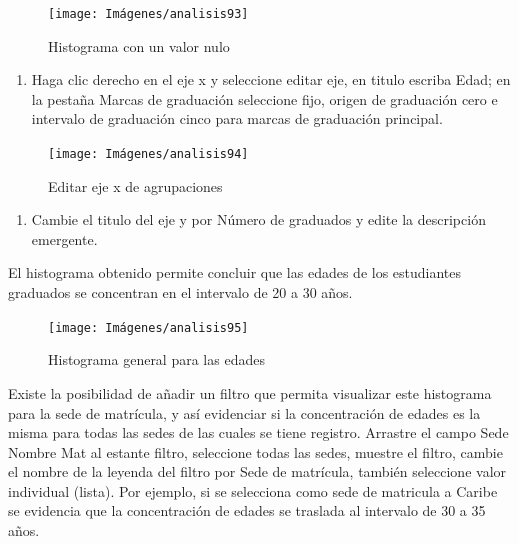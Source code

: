 \documentclass[
]{book}
\providecommand{\tightlist}{%
  \setlength{\itemsep}{0pt}\setlength{\parskip}{0pt}}
\begin{document}
\begin{figure}

{\centering \texttt{[image: Imágenes/analisis93]} 

}

\caption{Histograma con un valor nulo}\label{fig:paso6histograma-fig}
\end{figure}

\begin{enumerate}
\def\labelenumi{\arabic{enumi}.}
\setcounter{enumi}{6}
\tightlist
\item
  Haga clic derecho en el eje x y seleccione editar eje, en titulo escriba Edad; en la pestaña Marcas de graduación seleccione fijo, origen de graduación cero e intervalo de graduación cinco para marcas de graduación principal.
\end{enumerate}

\begin{figure}

{\centering \texttt{[image: Imágenes/analisis94]} 

}

\caption{Editar eje x de agrupaciones}\label{fig:paso7histograma-fig}
\end{figure}

\begin{enumerate}
\def\labelenumi{\arabic{enumi}.}
\setcounter{enumi}{7}
\tightlist
\item
  Cambie el titulo del eje y por Número de graduados y edite la descripción emergente.
\end{enumerate}

El histograma obtenido permite concluir que las edades de los estudiantes graduados se concentran en el intervalo de 20 a 30 años.

\begin{figure}

{\centering \texttt{[image: Imágenes/analisis95]} 

}

\caption{Histograma general para las edades}\label{fig:histogramabase-fig}
\end{figure}

Existe la posibilidad de añadir un filtro que permita visualizar este histograma para la sede de matrícula, y así evidenciar si la concentración de edades es la misma para todas las sedes de las cuales se tiene registro. Arrastre el campo Sede Nombre Mat al estante filtro, seleccione todas las sedes, muestre el filtro, cambie el nombre de la leyenda del filtro por Sede de matrícula, también seleccione valor individual (lista). Por ejemplo, si se selecciona como sede de matricula a Caribe se evidencia que la concentración de edades se traslada al intervalo de 30 a 35 años.
\end{document}
